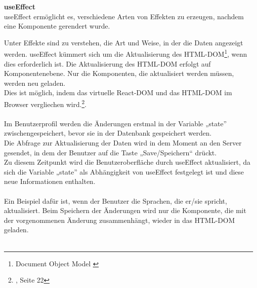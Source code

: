 \textbf{useEffect}
\\
useEffect ermöglicht es, verschiedene Arten von Effekten zu erzeugen, nachdem eine Komponente gerendert wurde.

Unter Effekte sind zu verstehen, die Art und Weise, in der die Daten angezeigt werden. useEffect kümmert sich um die Aktualisierung des HTML-DOM\footnote{Document Object Model {\cite{MO2}}}, wenn dies erforderlich ist. Die Aktualisierung des HTML-DOM erfolgt auf Komponentenebene. Nur die Komponenten, die aktualisiert werden müssen, werden neu geladen. 
\\
Dies ist möglich, indem  das virtuelle React-DOM{\cite{R06}} und das HTML-DOM im Browser vergliechen wird.\footnote{{\cite{AN1}, Seite 22}}.
\\\\


Im Benutzerprofil werden die Änderungen erstmal in der Variable „state” zwischengespeichert, bevor sie in der Datenbank gespeichert werden.
\\
Die Abfrage zur Aktualisierung der Daten wird in dem Moment an den Server gesendet, in dem der Benutzer auf die Taste „Save/Speichern“ drückt.
\\
Zu diesem Zeitpunkt wird die Benutzeroberfläche durch useEffect aktualisiert, da sich die Variable „state” als Abhängigkeit von useEffect festgelegt ist und diese neue Informationen enthalten.
\\\\
Ein Beispiel dafür ist, wenn der Benutzer die Sprachen, die er/sie spricht, aktualisiert. Beim Speichern der Änderungen wird nur die Komponente, die mit der vorgenommenen Änderung zusammenhängt, wieder in das HTML-DOM geladen.
\\\\


